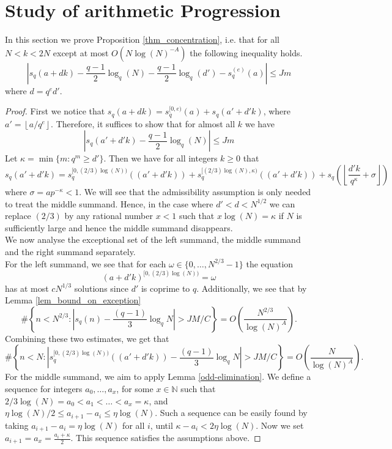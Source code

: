 \documentclass[12pt]{amsart}
\renewcommand{\leq}{\leqslant}
\renewcommand{\geq}{\geqslant}
\theoremstyle{definition}
\numberwithin{equation}{section}
\newcommand\NN{\mathbb{N}}
\numberwithin{equation}{section}
\begin{document}
\section{Study of arithmetic Progression}\label{sec_Arith_Prog}
In this section we prove Proposition \ref{thm_concentration}, i.e. that for all $N<k<2N$ except at most $O\left(N\log(N)^{-A}\right)$ the following inequality holds.
\[
	\left|s_q(a+dk)-\frac{q-1}2\log_{q}\left(N\right) - \frac{q-1}2\log_{q}(d')-s_q^{(e)}(a)\right|\leq Jm
\]
where $d=q^ed'$.
\begin{proof}
	First we notice that $s_q(a+dk)=s_q^{[0,e)}(a)+s_q(a'+d'k)$, where $a'= \left\lfloor a/q^{e}\right\rfloor$. Therefore, it suffices to show that for almost all $k$ we have
	\[
		\left|s_q(a'+d'k)-\frac{q-1}2\log_{q}\left(N\right)\right|\leq Jm
	\]
	Let $\kappa=\min\{m:q^m\geq d'\}$. Then we have for all integers $k\geq 0$ that
	\[
		s_q(a'+d'k)= s_q^{[0,(2/3)\log(N))}((a'+d'k)) + s_q^{[(2/3)\log(N),\kappa)}((a'+d'k)) + s_q\left(\left\lfloor\frac {d'k}{q^{\kappa}}+\sigma\right\rfloor\right)
	\]
	where $\sigma=ap^{-\kappa}<1$. We will see that the admissibility assumption is only needed to treat the middle summand. Hence, in the case where $d'<d<N^{1/2}$ we can replace $(2/3)$ by any rational number $x<1$ such that  $x\log(N)=\kappa$ if $N$ is sufficiently large and hence the middle summand disappears.\\
	We now analyse the exceptional set of the left summand, the middle summand and the right summand separately.\\
	For the left summand, we see that for each $\omega\in \{0,\dots, N^{2/3}-1\}$ the equation
	\[
		(a+d'k)^{[0,(2/3)\log(N))}=\omega
	\]
	has at most $cN^{1/3}$ solutions since $d'$ is coprime to $q$. Additionally, we see that by Lemma \ref{lem_bound_on_exception}
	\[
		\#\left\{n<N^{2/3}: \left|s_q(n)-\frac{(q-1)}3 \log_q N\right|>JM/C\right\}=O\left(\frac{N^{2/3}}{\log(N)^A}\right).
	\]
	Combining these two estimates, we get that
	\[
		\#\left\{n<N: \left|s_q^{[0,(2/3)\log(N))}((a'+d'k))-\frac{(q-1)}3 \log_q N\right|>JM/C\right\}=O\left(\frac{N}{\log(N)^A}\right).
	\]
	For the middle summand, we aim to apply Lemma \ref{odd-elimination}. We define a sequence for integers $a_0, \dots, a_x$, for some $x\in \NN$ such that $2/3\log(N)=a_0<a_1<\dots<a_x=\kappa$, and $\eta\log(N)/2 \leq a_{i+1}-a_i \leq \eta\log(N)$. Such a sequence can be easily found by taking $a_{i+1}-a_{i}=\eta\log(N)$ for all $i$, until $\kappa - a_{i} < 2\eta\log(N)$. Now we set $a_{i+1}=a_x=\frac{a_i+\kappa}{2}$. This sequence satisfies the assumptions above.

\end{proof}
\end{document}
